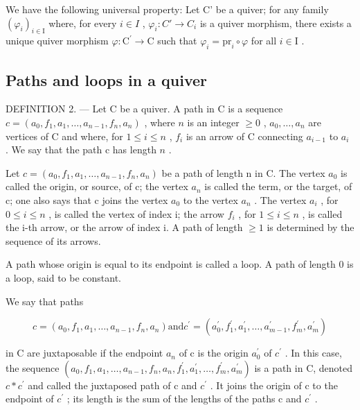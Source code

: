 We have the following universal property: Let C' be a quiver; for any family \((\varphi_{i})_{i\in\mathrm{I}}\) where, for every \(i\in I\) , \(\varphi_{i}\colon C'\to C_{i}\) is a quiver morphism, there exists a unique quiver morphism \(\varphi\colon\mathrm{C}^{\prime}\to\mathrm{C}\) such that \(\varphi_{i}=\mathrm{pr}_{i}\circ\varphi\) for all \(i\in\mathrm{I}\) .

\subsection{Paths and loops in a quiver}

DEFINITION 2. --- Let C be a quiver. A path in C is a sequence \(c = (a_{0}, f_{1}, a_{1}, \ldots, a_{n-1}, f_{n}, a_{n})\) , where \(n\) is an integer \(\geqslant 0\) , \(a_{0}, \ldots, a_{n}\) are vertices of C and where, for \(1 \leqslant i \leqslant n\) , \(f_{i}\) is an arrow of C connecting \(a_{i-1}\) to \(a_{i}\) . We say that the path c has length \(n\) .

Let \(c = (a_{0}, f_{1}, a_{1}, \ldots, a_{n-1}, f_{n}, a_{n})\) be a path of length n in C. The vertex \(a_{0}\) is called the origin, or source, of c; the vertex \(a_{n}\) is called the term, or the target, of c; one also says that c joins the vertex \(a_{0}\) to the vertex \(a_{n}\) . The vertex \(a_{i}\) , for \(0 \leqslant i \leqslant n\) , is called the vertex of index i; the arrow \(f_{i}\) , for \(1 \leqslant i \leqslant n\) , is called the i-th arrow, or the arrow of index i. A path of length \(\geqslant 1\) is determined by the sequence of its arrows.

A path whose origin is equal to its endpoint is called a loop. A path of length 0 is a loop, said to be constant.

We say that paths

\[
c = (a _ {0}, f _ {1}, a _ {1}, \ldots , a _ {n - 1}, f _ {n}, a _ {n}) \text{and} c ^ {\prime} = (a _ {0} ^ {\prime}, f _ {1} ^ {\prime}, a _ {1} ^ {\prime}, \ldots , a _ {m - 1} ^ {\prime}, f _ {m} ^ {\prime}, a _ {m} ^ {\prime})
\]

in C are juxtaposable if the endpoint \(a_{n}\) of c is the origin \(a_{0}^{\prime}\) of \(c^{\prime}\) . In this case, the sequence \((a_{0}, f_{1}, a_{1}, \ldots, a_{n-1}, f_{n}, a_{n}, f_{1}^{\prime}, a_{1}^{\prime}, \ldots, f_{m}^{\prime}, a_{m}^{\prime})\) is a path in C, denoted \(c * c^{\prime}\) and called the juxtaposed path of c and \(c^{\prime}\) . It joins the origin of c to the endpoint of \(c^{\prime}\) ; its length is the sum of the lengths of the paths c and \(c^{\prime}\) .

